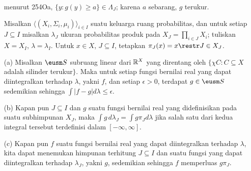 {

\noindent menurut 254Oa, $\{y:g(y)\ge a\}\in\Lambda_J$;  karena $a$ sebarang,
$g$ terukur.
}%

 Misalkan $\langle(X_i,\Sigma_i,\mu_i)\rangle_{i\in
I}$ suatu keluarga ruang probabilitas, dan untuk setiap $J\subseteq I$ misalkan
$\lambda_J$ ukuran probabilitas produk pada $X_J=\prod_{i\in
J}X_i$;  tuliskan $X=X_I$, $\lambda=\lambda_I$.   Untuk $x\in X$, $J\subseteq
I$, tetapkan $\pi_J(x)=x\restr J\in X_J$.

(a) Misalkan $\eusm S$ subruang linear dari $\Bbb R^X$ yang direntang oleh
$\{\chi C:C\subseteq X$ adalah silinder terukur$\}$.   Maka untuk setiap
fungsi bernilai real yang dapat diintegralkan terhadap $\lambda$, yakni $f$, dan setiap $\epsilon>0$,
terdapat $g\in\eusm S$ sedemikian sehingga $\int|f-g|d\lambda\le\epsilon$.

(b) Kapan pun $J\subseteq I$ dan $g$ suatu fungsi bernilai real yang didefinisikan pada
suatu subhimpunan $X_J$, maka $\int g\,d\lambda_J=\int g\pi_Jd\lambda$ jika
salah satu dari kedua integral tersebut terdefinisi dalam $[-\infty,\infty]$.

(c) Kapan pun $f$ suatu fungsi bernilai real yang dapat diintegralkan terhadap $\lambda$, kita dapat
menemukan himpunan terhitung $J\subseteq I$ dan suatu
fungsi yang dapat diintegralkan terhadap $\lambda_J$, yakni $g$, sedemikian sehingga $f$ memperluas $g\pi_J$.

